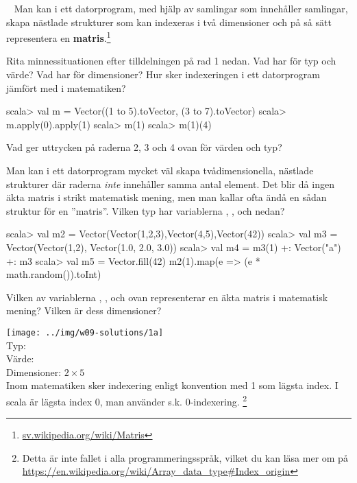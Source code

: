 \TaskSolved \what

\begin{ConceptConnections}

\end{ConceptConnections}

\QUESTEND





\QUESTBEGIN

\Task  \what~  Man kan i ett datorprogram, med hjälp av samlingar som innehåller samlingar, skapa nästlade strukturer som kan indexeras i två dimensioner och på så sätt representera en  \textbf{matris}.\footnote{\href{https://sv.wikipedia.org/wiki/Matris}{sv.wikipedia.org/wiki/Matris}}

\Subtask Rita minnessituationen efter tilldelningen på rad 1 nedan. Vad har  för typ och värde? Vad har  för dimensioner? Hur sker indexeringen i ett datorprogram jämfört med i matematiken?

\begin{REPL}
scala> val m = Vector((1 to 5).toVector, (3 to 7).toVector)
scala> m.apply(0).apply(1)
scala> m(1)
scala> m(1)(4)
\end{REPL}

\Subtask Vad ger uttrycken på raderna 2, 3 och 4 ovan för värden och typ?

\Subtask Man kan i ett datorprogram mycket väl skapa tvådimensionella, nästlade strukturer där raderna \emph{inte} innehåller samma antal element. Det blir då ingen äkta matris i strikt matematisk mening, men man kallar ofta ändå en sådan struktur för en ''matris''. Vilken typ har variablerna , ,  och  nedan?

\begin{REPL}
scala> val m2 = Vector(Vector(1,2,3),Vector(4,5),Vector(42))
scala> val m3 = Vector(Vector(1,2), Vector(1.0, 2.0, 3.0))
scala> val m4 = m3(1) +: Vector("a") +: m3
scala> val m5 = Vector.fill(42){ m2(1).map(e => (e * math.random()).toInt) }
\end{REPL}

\Subtask Vilken av variablerna , ,  och  ovan representerar en äkta matris i matematisk mening? Vilken är dess dimensioner?

\SOLUTION

\TaskSolved \what

\SubtaskSolved   \texttt{[image: ../img/w09-solutions/1a]} \\
Typ: \\
Värde:  \\
Dimensioner: $2 \times 5$\\
Inom matematiken sker indexering enligt konvention med 1 som lägsta index. I scala är lägsta index 0, man använder s.k. 0-indexering. \footnote{Detta är inte fallet i alla programmeringsspråk, vilket du kan läsa mer om på \url{https://en.wikipedia.org/wiki/Array\_data\_type\#Index\_origin}}

